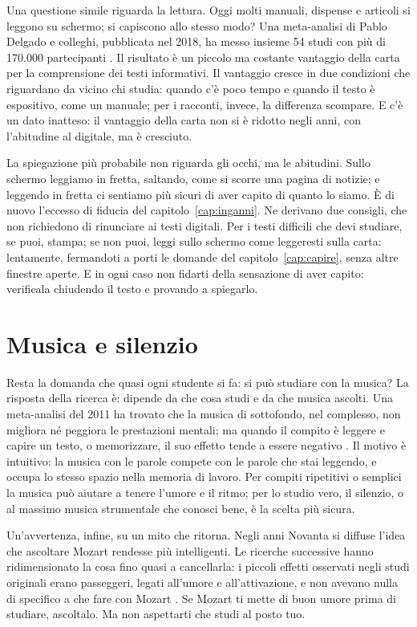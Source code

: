 Una questione simile riguarda la lettura. Oggi molti manuali, dispense
e articoli si leggono su schermo; si capiscono allo stesso modo? Una
meta-analisi di Pablo Delgado e colleghi, pubblicata nel 2018, ha messo
insieme 54 studi con più di 170.000 partecipanti \parencite{delgado2018}.
Il risultato è un piccolo ma costante vantaggio della carta per la
comprensione dei testi informativi. Il vantaggio cresce in due
condizioni che riguardano da vicino chi studia: quando c'è poco tempo e
quando il testo è espositivo, come un manuale; per i racconti, invece,
la differenza scompare. E c'è un dato inatteso: il vantaggio della carta
non si è ridotto negli anni, con l'abitudine al digitale, ma è
cresciuto.

La spiegazione più probabile non riguarda gli occhi, ma le abitudini.
Sullo schermo leggiamo in fretta, saltando, come si scorre una pagina
di notizie; e leggendo in fretta ci sentiamo più sicuri di aver capito
di quanto lo siamo. È di nuovo l'eccesso di fiducia del
capitolo~\ref{cap:inganni}. Ne derivano due consigli, che non
richiedono di rinunciare ai testi digitali. Per i testi difficili che
devi studiare, se puoi, stampa; se non puoi, leggi sullo schermo come
leggeresti sulla carta: lentamente, fermandoti a porti le domande del
capitolo~\ref{cap:capire}, senza altre finestre aperte. E in ogni caso
non fidarti della sensazione di aver capito: verificala chiudendo il
testo e provando a spiegarlo.

\section{Musica e silenzio}

Resta la domanda che quasi ogni studente si fa: si può studiare con la
musica? La risposta della ricerca è: dipende da che cosa studi e da che
musica ascolti. Una meta-analisi del 2011 ha trovato che la musica di
sottofondo, nel complesso, non migliora né peggiora le prestazioni
mentali; ma quando il compito è leggere e capire un testo, o
memorizzare, il suo effetto tende a essere negativo
\parencite{kampfe2011}. Il motivo è intuitivo: la musica con le parole
compete con le parole che stai leggendo, e occupa lo stesso spazio
nella memoria di lavoro. Per compiti ripetitivi o semplici la musica
può aiutare a tenere l'umore e il ritmo; per lo studio vero, il
silenzio, o al massimo musica strumentale che conosci bene, è la scelta
più sicura.

Un'avvertenza, infine, su un mito che ritorna. Negli anni Novanta si
diffuse l'idea che ascoltare Mozart rendesse più intelligenti. Le
ricerche successive hanno ridimensionato la cosa fino quasi a
cancellarla: i piccoli effetti osservati negli studi originali erano
passeggeri, legati all'umore e all'attivazione, e non avevano nulla di
specifico a che fare con Mozart \parencite{pietschnig2010}. Se Mozart ti
mette di buon umore prima di studiare, ascoltalo. Ma non aspettarti che
studi al posto tuo.

